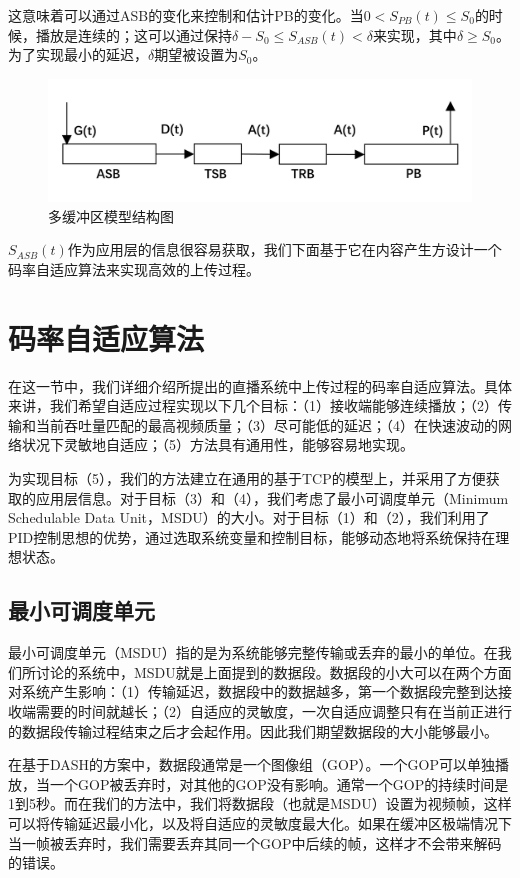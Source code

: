 这意味着可以通过ASB的变化来控制和估计PB的变化。当$0 < S_{PB}(t) \le S_0$的时候，播放是连续的；这可以通过保持$\delta - S_0 \le S_{ASB}(t) < \delta$来实现，其中$\delta \ge S_0$。为了实现最小的延迟，$\delta$期望被设置为$S_0$。

\begin{figure}[t]
	\centering
	\includegraphics[width = 1.0\linewidth]{clip/21.png}
	\caption{多缓冲区模型结构图\label{fig:21}}
\end{figure}

$S_{ASB}(t)$作为应用层的信息很容易获取，我们下面基于它在内容产生方设计一个码率自适应算法来实现高效的上传过程。


\section{码率自适应算法}

在这一节中，我们详细介绍所提出的直播系统中上传过程的码率自适应算法。具体来讲，我们希望自适应过程实现以下几个目标：（1）接收端能够连续播放；（2）传输和当前吞吐量匹配的最高视频质量；（3）尽可能低的延迟；（4）在快速波动的网络状况下灵敏地自适应；（5）方法具有通用性，能够容易地实现。

为实现目标（5），我们的方法建立在通用的基于TCP的模型上，并采用了方便获取的应用层信息。对于目标（3）和（4），我们考虑了最小可调度单元（Minimum Schedulable Data Unit，MSDU）的大小。对于目标（1）和（2），我们利用了PID控制思想的优势，通过选取系统变量和控制目标，能够动态地将系统保持在理想状态。

\subsection{最小可调度单元}

最小可调度单元（MSDU）指的是为系统能够完整传输或丢弃的最小的单位。在我们所讨论的系统中，MSDU就是上面提到的数据段。数据段的小大可以在两个方面对系统产生影响：（1）传输延迟，数据段中的数据越多，第一个数据段完整到达接收端需要的时间就越长；（2）自适应的灵敏度，一次自适应调整只有在当前正进行的数据段传输过程结束之后才会起作用。因此我们期望数据段的大小能够最小。

在基于DASH的方案中，数据段通常是一个图像组（GOP）\supercite{Cicco2011}。一个GOP可以单独播放，当一个GOP被丢弃时，对其他的GOP没有影响。通常一个GOP的持续时间是1到5秒。而在我们的方法中，我们将数据段（也就是MSDU）设置为视频帧，这样可以将传输延迟最小化，以及将自适应的灵敏度最大化。如果在缓冲区极端情况下当一帧被丢弃时，我们需要丢弃其同一个GOP中后续的帧，这样才不会带来解码的错误。

